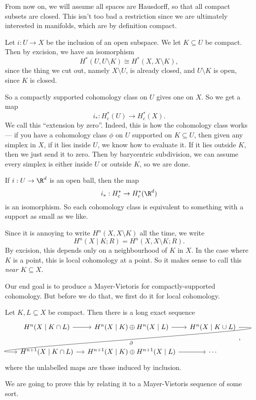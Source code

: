 \documentclass[a4paper]{article}
\theoremstyle{definition}
\begin{document}
From now on, we will assume all spaces are Hausdorff, so that all compact subsets are closed. This isn't too bad a restriction since we are ultimately interested in manifolds, which are by definition compact.

Let $i: U \to X$ be the inclusion of an open subspace. We let $K \subseteq U$ be compact. Then by excision, we have an isomorphism
\[
  H^*(U, U \setminus K) \cong H^*(X, X \setminus K),
\]
since the thing we cut out, namely $X \setminus U$, is already closed, and $U \setminus K$ is open, since $K$ is closed.

So a compactly supported cohomology class on $U$ gives one on $X$. So we get a map
\[
  i_*: H_c^*(U) \to H_c^*(X).
\]
We call this ``extension by zero''. Indeed, this is how the cohomology class works --- if you have a cohomology class $\phi$ on $U$ supported on $K \subseteq U$, then given any simplex in $X$, if it lies inside $U$, we know how to evaluate it. If it lies outside $K$, then we just send it to zero. Then by barycentric subdivision, we can assume every simplex is either inside $U$ or outside $K$, so we are done.

\begin{eg}
  If $i: U \to \R^d$ is an open ball, then the map
  \[
    i_*: H_c^* \to H_c^*(\R^d)
  \]
  is an isomorphism. So each cohomology class is equivalent to something with a support as small as we like.
\end{eg}

Since it is annoying to write $H^n(X, X \setminus K)$ all the time, we write
\[
  H^n(X\mid K; R) = H^n(X, X \setminus K; R).
\]
By excision, this depends only on a neighbourhood of $K$ in $X$. In the case where $K$ is a point, this is local cohomology at a point. So it makes sense to call this  \emph{near $K \subseteq X$}.

Our end goal is to produce a Mayer-Vietoris for compactly-supported cohomology. But before we do that, we first do it for local cohomology.

\begin{prop}
  Let $K, L \subseteq X$ be compact. Then there is a long exact sequence
  \[
    \begin{tikzcd}[column sep=small]
      H^n(X \mid K \cap L) \ar[r] & H^n(X \mid K) \oplus H^n(X \mid L) \ar[r] & H^n(X \mid K \cup L) \ar[out=0, in=180, overlay, lld, "\partial"]\\
      H^{n + 1}(X \mid K \cap L) \ar[r] & H^{n + 1}(X \mid K) \oplus H^{n + 1}(X \mid L) \ar[r] & \cdots
    \end{tikzcd},
  \]
  where the unlabelled maps are those induced by inclusion.
\end{prop}
We are going to prove this by relating it to a Mayer-Vietoris sequence of some sort.
\end{document}
